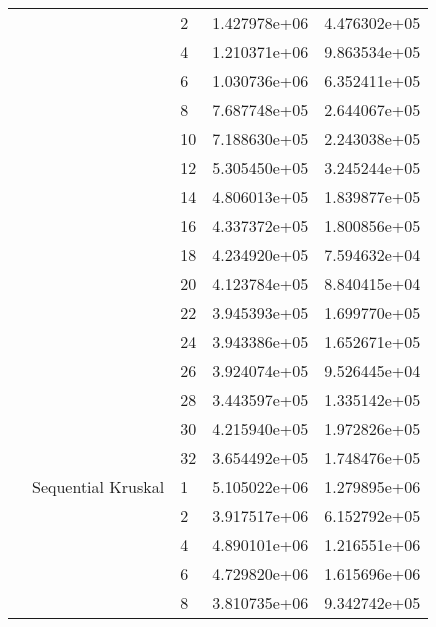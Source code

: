 \begin{tabular}{lllrr}
                      &                     & 2  &  1.427978e+06 &  4.476302e+05 \\
                      &                     & 4  &  1.210371e+06 &  9.863534e+05 \\
                      &                     & 6  &  1.030736e+06 &  6.352411e+05 \\
                      &                     & 8  &  7.687748e+05 &  2.644067e+05 \\
                      &                     & 10 &  7.188630e+05 &  2.243038e+05 \\
                      &                     & 12 &  5.305450e+05 &  3.245244e+05 \\
                      &                     & 14 &  4.806013e+05 &  1.839877e+05 \\
                      &                     & 16 &  4.337372e+05 &  1.800856e+05 \\
                      &                     & 18 &  4.234920e+05 &  7.594632e+04 \\
                      &                     & 20 &  4.123784e+05 &  8.840415e+04 \\
                      &                     & 22 &  3.945393e+05 &  1.699770e+05 \\
                      &                     & 24 &  3.943386e+05 &  1.652671e+05 \\
                      &                     & 26 &  3.924074e+05 &  9.526445e+04 \\
                      &                     & 28 &  3.443597e+05 &  1.335142e+05 \\
                      &                     & 30 &  4.215940e+05 &  1.972826e+05 \\
                      &                     & 32 &  3.654492e+05 &  1.748476e+05 \\
                      & Sequential Kruskal & 1  &  5.105022e+06 &  1.279895e+06 \\
                      &                     & 2  &  3.917517e+06 &  6.152792e+05 \\
                      &                     & 4  &  4.890101e+06 &  1.216551e+06 \\
                      &                     & 6  &  4.729820e+06 &  1.615696e+06 \\
                      &                     & 8  &  3.810735e+06 &  9.342742e+05 \\

\end{tabular}
